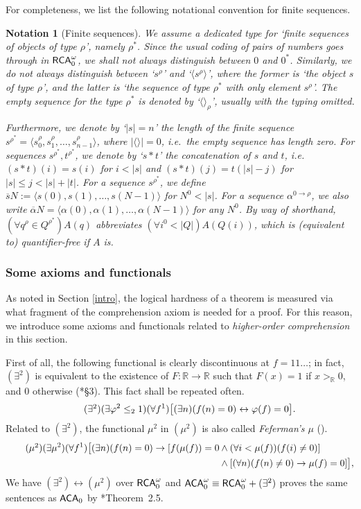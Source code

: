 \documentclass[reqno]{amsart}
\newtheorem{nota}[thm]{Notation}
\newcommand\be{\begin{equation}}
\newcommand\ee{\end{equation}}
\def\RCAo{\textup{\textsf{RCA}}_{0}^{\omega}}
\def\ACAo{\textup{\textsf{ACA}}_{0}^{\omega}}
\def\R{{\mathbb  R}}
\def\di{\rightarrow}
\def\asa{\leftrightarrow}
\def\ACA{\textup{\textsf{ACA}}}
\numberwithin{equation}{section}
\numberwithin{thm}{section}
\begin{document}
For completeness, we list the following notational convention for finite sequences.  
\begin{nota}[Finite sequences]\label{skim}\rm
We assume a dedicated type for `finite sequences of objects of type $\rho$', namely $\rho^{*}$.  Since the usual coding of pairs of numbers goes through in $\RCAo$, we shall not always distinguish between $0$ and $0^{*}$. 
Similarly, we do not always distinguish between `$s^{\rho}$' and `$\langle s^{\rho}\rangle$', where the former is `the object $s$ of type $\rho$', and the latter is `the sequence of type $\rho^{*}$ with only element $s^{\rho}$'.  The empty sequence for the type $\rho^{*}$ is denoted by `$\langle \rangle_{\rho}$', usually with the typing omitted.  

\smallskip

Furthermore, we denote by `$|s|=n$' the length of the finite sequence $s^{\rho^{*}}=\langle s_{0}^{\rho},s_{1}^{\rho},\dots,s_{n-1}^{\rho}\rangle$, where $|\langle\rangle|=0$, i.e.\ the empty sequence has length zero.
For sequences $s^{\rho^{*}}, t^{\rho^{*}}$, we denote by `$s*t$' the concatenation of $s$ and $t$, i.e.\ $(s*t)(i)=s(i)$ for $i<|s|$ and $(s*t)(j)=t(|s|-j)$ for $|s|\leq j< |s|+|t|$. For a sequence $s^{\rho^{*}}$, we define $\overline{s}N:=\langle s(0), s(1), \dots,  s(N-1)\rangle $ for $N^{0}<|s|$.  
For a sequence $\alpha^{0\di \rho}$, we also write $\overline{\alpha}N=\langle \alpha(0), \alpha(1),\dots, \alpha(N-1)\rangle$ for \emph{any} $N^{0}$.  By way of shorthand, 
$(\forall q^{\rho}\in Q^{\rho^{*}})A(q)$ abbreviates $(\forall i^{0}<|Q|)A(Q(i))$, which is (equivalent to) quantifier-free if $A$ is.   
\end{nota}
\subsubsection{Some axioms and functionals}\label{lll}
As noted in Section \ref{intro}, the logical hardness of a theorem is measured via what fragment of the comprehension axiom is needed for a proof.  
For this reason, we introduce some axioms and functionals related to \emph{higher-order comprehension} in this section.

\smallskip

First of all, the following functional is clearly discontinuous at $f=11\dots$; in fact, $(\exists^{2})$ is equivalent to the existence of $F:\R\di\R$ such that $F(x)=1$ if $x>_{\R}0$, and $0$ otherwise (\cite{kohlenbach2}*{\S3}).  This fact shall be repeated often.  
\be\label{muk}\tag{$\exists^{2}$}
(\exists \varphi^{2}\leq_{2}1)(\forall f^{1})\big[(\exists n)(f(n)=0) \asa \varphi(f)=0    \big]. 
\ee
Related to $(\exists^{2})$, the functional $\mu^{2}$ in $(\mu^{2})$ is also called \emph{Feferman's $\mu$} (\cite{avi2}).
\begin{align}\label{mu}\tag{$\mu^{2}$}
(\exists \mu^{2})(\forall f^{1})\big[ (\exists n)(f(n)=0) \di [f(\mu(f))=0&\wedge (\forall i<\mu(f))(f(i)\ne 0) ]\\
& \wedge [ (\forall n)(f(n)\ne0)\di   \mu(f)=0]    \big], \notag
\end{align}
We have $(\exists^{2})\asa (\mu^{2})$ over $\RCAo$ and $\ACAo\equiv\RCAo+(\exists^{2})$ proves the same sentences as $\ACA_{0}$ by \cite{hunterphd}*{Theorem~2.5}. 
\end{document}
